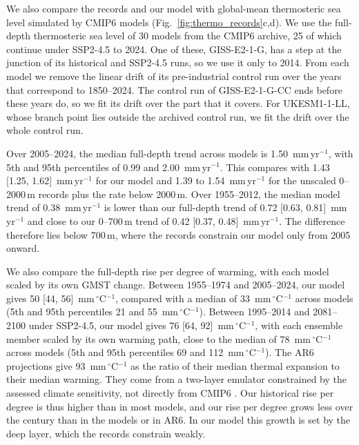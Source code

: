 \documentclass[12pt]{article}
\begin{document}
We also compare the records and our model with global-mean thermosteric sea level simulated by CMIP6 models (Fig.~\ref{fig:thermo_records}c,d). We use the full-depth thermosteric sea level of 30 models from the CMIP6 archive, 25 of which continue under SSP2-4.5 to 2024. One of these, GISS-E2-1-G, has a step at the junction of its historical and SSP2-4.5 runs, so we use it only to 2014. From each model we remove the linear drift of its pre-industrial control run over the years that correspond to 1850--2024. The control run of GISS-E2-1-G-CC ends before these years do, so we fit its drift over the part that it covers. For UKESM1-1-LL, whose branch point lies outside the archived control run, we fit the drift over the whole control run.

Over 2005--2024, the median full-depth trend across models is 1.50~mm\,yr$^{-1}$, with 5th and 95th percentiles of 0.99 and 2.00~mm\,yr$^{-1}$. This compares with 1.43 [1.25, 1.62]~mm\,yr$^{-1}$ for our model and 1.39 to 1.54~mm\,yr$^{-1}$ for the unscaled 0--2000\,m records plus the rate below 2000\,m. Over 1955--2012, the median model trend of 0.38~mm\,yr$^{-1}$ is lower than our full-depth trend of 0.72 [0.63, 0.81]~mm\,yr$^{-1}$ and close to our 0--700\,m trend of 0.42 [0.37, 0.48]~mm\,yr$^{-1}$. The difference therefore lies below 700\,m, where the records constrain our model only from 2005 onward.

We also compare the full-depth rise per degree of warming, with each model scaled by its own GMST change. Between 1955--1974 and 2005--2024, our model gives 50 [44, 56]~mm\,$^\circ$C$^{-1}$, compared with a median of 33~mm\,$^\circ$C$^{-1}$ across models (5th and 95th percentiles 21 and 55~mm\,$^\circ$C$^{-1}$). Between 1995--2014 and 2081--2100 under SSP2-4.5, our model gives 76 [64, 92]~mm\,$^\circ$C$^{-1}$, with each ensemble member scaled by its own warming path, close to the median of 78~mm\,$^\circ$C$^{-1}$ across models (5th and 95th percentiles 69 and 112~mm\,$^\circ$C$^{-1}$). The AR6 projections give 93~mm\,$^\circ$C$^{-1}$ as the ratio of their median thermal expansion to their median warming. They come from a two-layer emulator constrained by the assessed climate sensitivity, not directly from CMIP6 \citep{Fox-Kemper2021}. Our historical rise per degree is thus higher than in most models, and our rise per degree grows less over the century than in the models or in AR6. In our model this growth is set by the deep layer, which the records constrain weakly.
\end{document}
